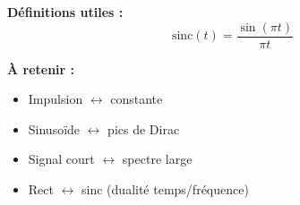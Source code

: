 \documentclass[a4paper,10pt]{article}
\begin{document}
    \vspace{0.2cm}

    \textbf{Définitions utiles :}
    \[
    \text{sinc}(t) = \frac{\sin(\pi t)}{\pi t}
    \]

    

    \textbf{À retenir :}
    \begin{itemize}
        \item Impulsion $\leftrightarrow$ constante
        \item Sinusoïde $\leftrightarrow$ pics de Dirac
        \item Signal court $\leftrightarrow$ spectre large
        \item Rect $\leftrightarrow$ sinc (dualité temps/fréquence)
    \end{itemize}
\end{document}

